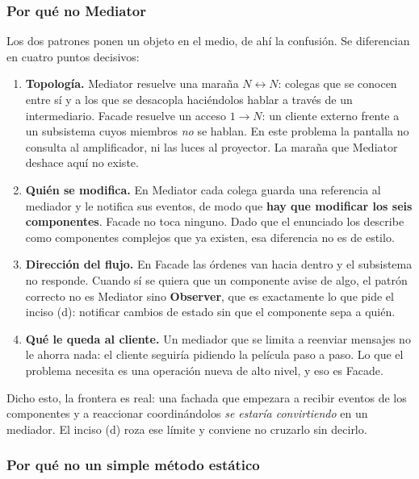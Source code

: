 \subsubsection*{Por qué no Mediator}

Los dos patrones ponen un objeto en el medio, de ahí la confusión. Se diferencian en cuatro
puntos decisivos:

\begin{enumerate}[leftmargin=1.2cm]
    \item \textbf{Topología.} Mediator resuelve una maraña $N \leftrightarrow N$: colegas
          que se conocen entre sí y a los que se desacopla haciéndolos hablar a través de un
          intermediario. Facade resuelve un acceso $1 \rightarrow N$: un cliente externo
          frente a un subsistema cuyos miembros \emph{no} se hablan. En este problema la
          pantalla no consulta al amplificador, ni las luces al proyector. La maraña que
          Mediator deshace aquí no existe.
    \item \textbf{Quién se modifica.} En Mediator cada colega guarda una referencia al
          mediador y le notifica sus eventos, de modo que \textbf{hay que modificar los seis
          componentes}. Facade no toca ninguno. Dado que el enunciado los describe como
          componentes complejos que ya existen, esa diferencia no es de estilo.
    \item \textbf{Dirección del flujo.} En Facade las órdenes van hacia dentro y el
          subsistema no responde. Cuando sí se quiera que un componente avise de algo, el
          patrón correcto no es Mediator sino \textbf{Observer}, que es exactamente lo que
          pide el inciso (d): notificar cambios de estado sin que el componente sepa a quién.
    \item \textbf{Qué le queda al cliente.} Un mediador que se limita a reenviar mensajes no
          le ahorra nada: el cliente seguiría pidiendo la película paso a paso. Lo que el
          problema necesita es una operación nueva de alto nivel, y eso es Facade.
\end{enumerate}

Dicho esto, la frontera es real: una fachada que empezara a recibir eventos de los
componentes y a reaccionar coordinándolos \emph{se estaría convirtiendo} en un mediador. El
inciso (d) roza ese límite y conviene no cruzarlo sin decirlo.

\subsubsection*{Por qué no un simple método estático}

